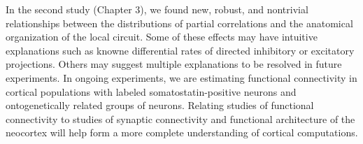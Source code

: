 In the second study (Chapter 3), we found new, robust, and nontrivial relationships between the distributions of partial correlations and the anatomical organization of the local circuit. Some of these effects may have intuitive explanations such as knowne  differential  rates of directed inhibitory or excitatory projections.  Others may suggest multiple explanations to be resolved in future experiments. In ongoing experiments, we are estimating functional connectivity in cortical populations with labeled somatostatin-positive neurons and ontogenetically related groups of neurons. Relating studies of functional connectivity to studies of synaptic connectivity and functional architecture of the neocortex will help form a more complete understanding of cortical computations.

